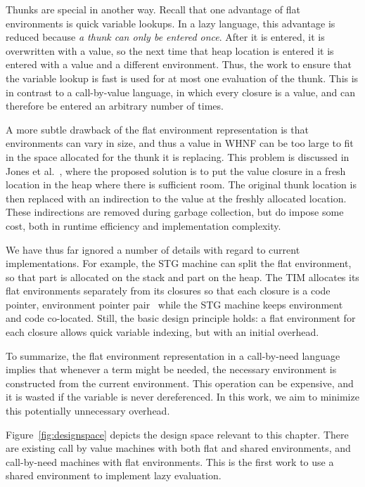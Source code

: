 Thunks are special in another way.  Recall that one advantage of flat
environments is quick variable lookups. In a lazy language, this advantage is
reduced because \emph{a thunk can only be entered once}. After it is entered, it
is overwritten with a value, so the next time that heap location is entered it
is entered with a value and a different environment. Thus, the work to ensure
that the variable lookup is fast is used for at most one evaluation of the
thunk. This is in contrast to a call-by-value language, in which every closure
is a value, and can therefore be entered an arbitrary number of times. 

A more subtle drawback of the flat environment representation is that
environments can vary in size, and thus a value in WHNF can be too large to fit
in the space allocated for the thunk it is replacing. This problem is discussed
in Jones et al.~\cite{jonesstg}, where the proposed solution is to put the value
closure in a fresh location in the heap where there is sufficient room. The
original thunk location is then replaced with an indirection to the value at the
freshly allocated location. These indirections are removed during garbage
collection, but do impose some cost, both in runtime efficiency and
implementation complexity.

We have thus far ignored a number of details with regard to current
implementations. For example, the STG machine can split the flat environment, so
that part is allocated on the stack and part on the heap.  The TIM allocates its
flat environments separately from its closures so that each closure is a code
pointer, environment pointer pair~\cite{TIM} while the STG machine keeps
environment and code co-located. Still, the basic design principle holds: a flat
environment for each closure allows quick variable indexing, but with an initial
overhead.

To summarize, the flat environment representation in a call-by-need language
implies that whenever a term might be needed, the necessary environment is
constructed from the current environment.  This operation can be expensive, and
it is wasted if the variable is never dereferenced. In this work, we aim to
minimize this potentially unnecessary overhead.

Figure~\ref{fig:designspace} depicts the design space relevant to this chapter.
There are existing call by value machines with both flat and shared
environments, and call-by-need machines with flat environments. This is the
first work to use a shared environment to implement lazy evaluation. 

